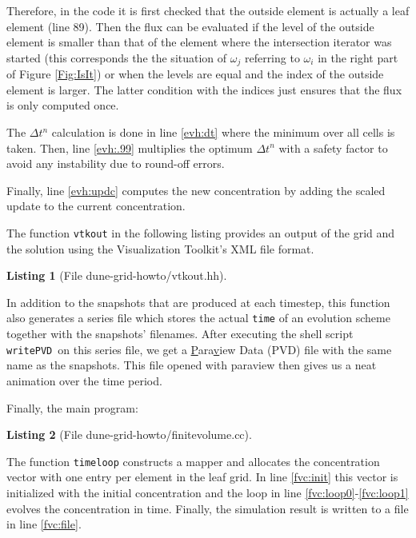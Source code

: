 \documentclass[11pt,a4paper,headinclude,footinclude,DIV16,normalheadings]{scrreprt}
\newtheorem{lst}{Listing}
\begin{document}
Therefore, in the code it is first checked that the outside element is
actually a leaf element (line 89). Then the flux can be evaluated if
the level of the outside element is smaller than that of the element
where the intersection iterator was started (this corresponds the the
situation of $\omega_j$ referring to $\omega_i$ in the right part of Figure
\ref{Fig:IsIt}) or when the levels are equal and the index of
the outside element is larger. The latter condition with the indices
just ensures that the flux is only computed once.

The $\Delta t^n$ calculation is done in line \ref{evh:dt} where the
minimum over all cells is taken. Then, line \ref{evh:.99} multiplies
the optimum $\Delta t^n$ with a safety factor to avoid any instability
due to round-off errors.

Finally, line \ref{evh:updc} computes the new concentration by adding
the scaled update to the current concentration.

The function \lstinline!vtkout! in the following listing provides an
output of the grid and the solution using the Visualization Toolkit's \cite{VTK}
XML file format.

\begin{lst}[File dune-grid-howto/vtkout.hh] \mbox{}
\nopagebreak

\end{lst}

In addition to the snapshots that are produced at each timestep, this function
also generates a series file which stores the actual \lstinline!time! of an
evolution scheme together with the snapshots' filenames.  After executing the
shell script \lstinline!writePVD!\ on this series file, we get a
\underline{P}ara\underline{v}iew {D}ata (PVD) file with the same name as the
snapshots. This file opened with paraview then gives us a neat animation over
the time period.

Finally, the main program:

\begin{lst}[File dune-grid-howto/finitevolume.cc] \mbox{}
\nopagebreak

\end{lst}

The function \lstinline!timeloop! constructs a mapper and allocates the
concentration vector with one entry per element in the leaf grid. In
line \ref{fvc:init} this vector is initialized with the initial
concentration and the loop in line \ref{fvc:loop0}-\ref{fvc:loop1}
evolves the concentration in time. Finally, the simulation result is
written to a file in line \ref{fvc:file}.
\end{document}
